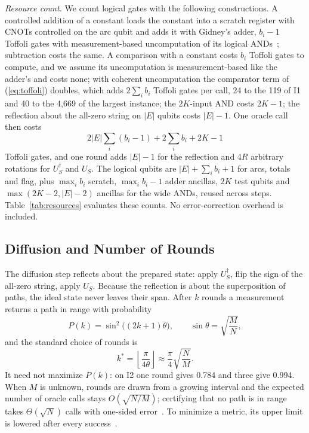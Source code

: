\documentclass[journal]{IEEEtran}
\begin{document}
\emph{Resource count.} We count logical gates with the following constructions. A controlled addition of a constant loads the constant into a scratch register with CNOTs controlled on the arc qubit and adds it with Gidney's adder, $b_{i}-1$ Toffoli gates with measurement-based uncomputation of its logical ANDs~\cite{gidney2018}; subtraction costs the same. A comparison with a constant costs $b_{i}$ Toffoli gates to compute, and we assume its uncomputation is measurement-based like the adder's and costs none; with coherent uncomputation the comparator term of (\ref{eq:toffoli}) doubles, which adds $2\sum_{i}b_{i}$ Toffoli gates per call, 24 to the 119 of I1 and 40 to the 4{,}669 of the largest instance; the $2K$-input AND costs $2K-1$; the reflection about the all-zero string on $|E|$ qubits costs $|E|-1$. One oracle call then costs
\begin{equation}
  2|E|\sum_{i}(b_{i}-1) + 2\sum_{i} b_{i} + 2K - 1
  \label{eq:toffoli}
\end{equation}
Toffoli gates, and one round adds $|E|-1$ for the reflection and $4R$ arbitrary rotations for $U_{S}^{\dagger}$ and $U_{S}$. The logical qubits are $|E|+\sum_{i}b_{i}+1$ for arcs, totals and flag, plus $\max_{i}b_{i}$ scratch, $\max_{i}b_{i}-1$ adder ancillas, $2K$ test qubits and $\max(2K-2,|E|-2)$ ancillas for the wide ANDs, reused across steps. Table~\ref{tab:resources} evaluates these counts. No error-correction overhead is included.

\subsection{Diffusion and Number of Rounds}

The diffusion step reflects about the prepared state: apply $U_{S}^{\dagger}$, flip the sign of the all-zero string, apply $U_{S}$. Because the reflection is about the superposition of paths, the ideal state never leaves their span. After $k$ rounds a measurement returns a path in range with probability~\cite{boyer1998,brassard2002}
\begin{equation}
  P(k) = \sin^{2}\bigl((2k+1)\theta\bigr), \qquad
  \sin\theta = \sqrt{\frac{M}{N}},
  \label{eq:sinelaw}
\end{equation}
and the standard choice of rounds is
\begin{equation}
  k^{*} = \left\lfloor \frac{\pi}{4\theta} \right\rfloor
  \approx \frac{\pi}{4}\sqrt{\frac{N}{M}} .
  \label{eq:rounds}
\end{equation}
It need not maximize $P(k)$: on I2 one round gives 0.784 and three give 0.994. When $M$ is unknown, rounds are drawn from a growing interval and the expected number of oracle calls stays $O(\sqrt{N/M})$; certifying that no path is in range takes $\Theta(\sqrt{N})$ calls with one-sided error~\cite{boyer1998}. To minimize a metric, its upper limit is lowered after every success~\cite{durr1996}.
\end{document}
